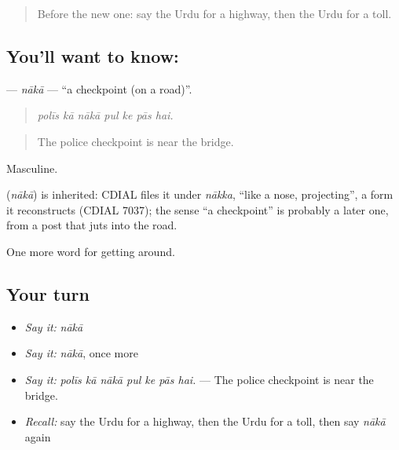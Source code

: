 \label{lesson:UR-C396-naka}



\begin{quote}
Before the new one: say the Urdu for a highway, then the Urdu for a toll.
\end{quote}

\subsection*{You'll want to know: }
\textbf{} — \emph{nākā} — \textquotedblleft{}a checkpoint (on a road)\textquotedblright{}.

\begin{quote}
      
\end{quote}

\begin{quote}
\emph{polīs kā nākā pul ke pās hai.}
\end{quote}

\begin{quote}
The police checkpoint is near the bridge.
\end{quote}

Masculine.

\begin{cousinweb}
\textbf{} (\emph{nākā}) is inherited: CDIAL files it under \emph{nākka}, \textquotedblleft{}like a nose, projecting\textquotedblright{}, a form it reconstructs (CDIAL 7037); the sense \textquotedblleft{}a checkpoint\textquotedblright{} is probably a later one, from a post that juts into the road.
\end{cousinweb}

\begin{grammarlens}[title={What you've built}]
One more word for getting around.
\end{grammarlens}

\subsection*{Your turn}
\begin{itemize}
\raggedright
  \item \emph{Say it:} \emph{nākā}
  \item \emph{Say it:} \emph{nākā}, once more
  \item \emph{Say it:} \emph{polīs kā nākā pul ke pās hai.} — The police checkpoint is near the bridge.
  \item \emph{Recall:} say the Urdu for a highway, then the Urdu for a toll, then say \emph{nākā} again
\end{itemize}

